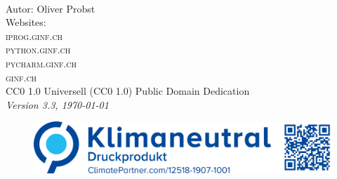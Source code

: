 
\newpage
~\vfill
\thispagestyle{empty}

\noindent Autor: Oliver Probst\\

\noindent Websites:\\
\noindent \textsc{iprog.ginf.ch}\\
\noindent \textsc{python.ginf.ch}\\
\noindent \textsc{pycharm.ginf.ch}\\
\noindent \textsc{ginf.ch}\\

\noindent \ccLogo \hspace{0.1cm} \ccZero \hspace{0.1cm} CC0 1.0 Universell (CC0 1.0) Public Domain Dedication \\

\noindent \textit{Version 3.3, \today}

\begin{figure}[htb]
\includegraphics[scale=0.15]{climate}
\end{figure}

